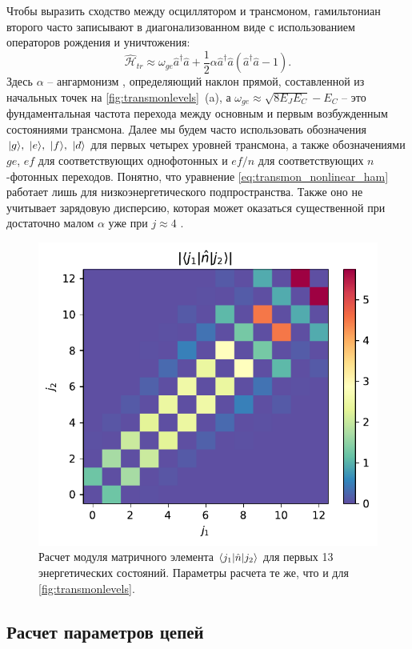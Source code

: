 \documentclass[14pt, a4paper]{extreport}
\DeclarePairedDelimiter\bra{\langle}{\rvert}
\DeclarePairedDelimiter\ket{\lvert}{\rangle}
\numberwithin{equation}{section}
\begin{document}
Чтобы выразить сходство между осциллятором и трансмоном, гамильтониан второго часто записывают в диагонализованном виде с использованием операторов рождения и уничтожения:
\begin{equation}
	\hat{\mathcal{H}}_{tr} \approx \omega_{ge} \hat a^\dag \hat a + \frac{1}{2}\alpha \hat a^\dag \hat a(\hat a^\dag \hat a - 1).\label{eq:transmon_nonlinear_ham}
\end{equation}
Здесь $\alpha$ -- ангармонизм \cite{koch2007charge}, определяющий наклон прямой, составленной из начальных точек на \autoref{fig:transmonlevels}~(a), а $\omega_{ge} \approx \sqrt{8 E_J E_C} - E_C$ -- это фундаментальная частота перехода между основным и первым возбужденным состояниями трансмона. Далее мы будем часто использовать обозначения $\ket{g},\ \ket{e},\ \ket{f},\ \ket{d}$ для первых четырех уровней трансмона, а также обозначениями $ge$, $ef$ для соответствующих однофотонных и $ef/n$ для соответствующих $n$-фотонных переходов. Понятно, что уравнение \eqref{eq:transmon_nonlinear_ham} работает лишь для низкоэнергетического подпространства. Также оно не учитывает зарядовую дисперсию, которая может оказаться существенной при достаточно малом $\alpha$ уже при $j \approx 4$ \cite{peterer2015coherence}.


\begin{figure}
	\centering
	\includegraphics[width=0.5\linewidth]{Pictures/transmon_n_melements}
	\caption{Расчет модуля матричного элемента $\bra{j_1} \hat n \ket{j_2}$ для первых 13 энергетических состояний. Параметры расчета те же, что и для \autoref{fig:transmonlevels}.}
	\label{fig:transmonnmelements}
\end{figure}


\subsection{Расчет параметров цепей}
\end{document}
